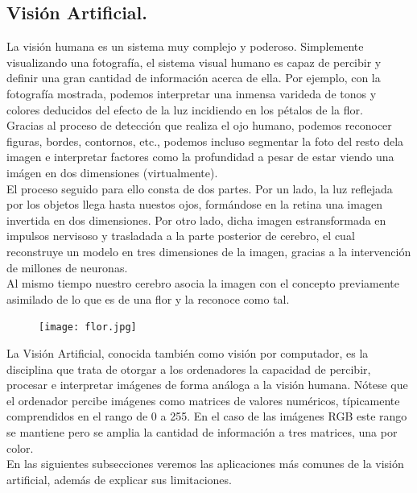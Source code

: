 \documentclass[a4paper,10pt]{article}
\begin{document}
\subsection{Visión Artificial.}
La visión humana es un sistema muy complejo y poderoso. Simplemente
visualizando una fotografía, el sistema visual humano es capaz
de percibir y definir una gran cantidad de información acerca de ella. Por ejemplo, con la fotografía mostrada, podemos interpretar una inmensa varideda de tonos y colores deducidos del efecto de la luz incidiendo en los pétalos de la flor.
\\Gracias al proceso de detección que realiza el ojo humano, podemos reconocer figuras, bordes, contornos, etc., podemos incluso segmentar la foto del resto dela imagen e interpretar factores como la profundidad a pesar de estar viendo una imágen en dos dimensiones (virtualmente).\\
El proceso seguido para ello consta de dos partes. Por un lado, la luz reflejada por los objetos llega hasta nuestos ojos, formándose en la retina una imagen invertida en dos
dimensiones.  Por otro lado, dicha imagen estransformada en impulsos nervisoso y trasladada a la parte posterior de cerebro, 
el cual reconstruye un modelo en tres dimensiones de la imagen, gracias a la intervención de millones de neuronas. 
\\Al mismo tiempo nuestro cerebro asocia la imagen con el concepto previamente asimilado de lo que es de una flor y la reconoce como tal.
\begin{figure}[H]
\centering
\texttt{[image: flor.jpg]}
\end{figure}
\noindent
La Visión Artificial, conocida también como visión por computador, es la disciplina que trata de otorgar a los ordenadores la capacidad de percibir, procesar  e interpretar imágenes de forma análoga a la visión humana. Nótese que el ordenador percibe imágenes como matrices de valores numéricos, típicamente comprendidos en el rango de 0 a 255. En el caso de las imágenes RGB este rango se mantiene pero se amplia la cantidad de información a tres matrices, una por color.\\
En las siguientes subsecciones veremos las aplicaciones más comunes de la visión artificial, además de explicar sus limitaciones.
\end{document}
